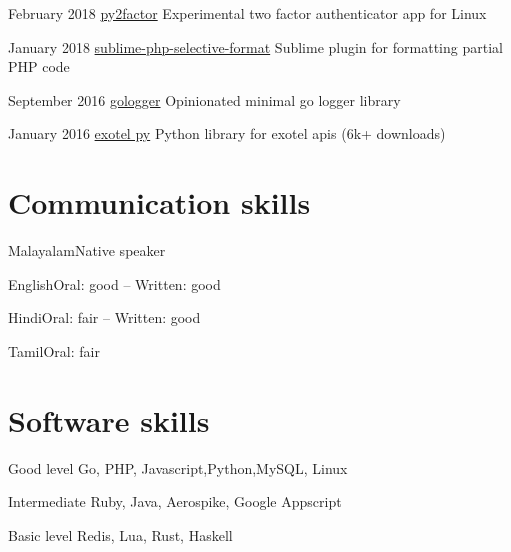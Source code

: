 \documentclass{tccv}
\begin{document}
 \begin{yearlist}

 \item{February 2018}
      {\href{http://me.sarathsp.com/py2factor/}{py2factor}}
      {Experimental two factor authenticator app for Linux}

 \item{January 2018}
      {\href{https://github.com/sarathsp06/sublime-php-selective-format}{sublime-php-selective-format}}
      {Sublime plugin for formatting partial PHP code }

 \item{September 2016}
      {\href{https://github.com/sarathsp06/gologger}{gologger}}
      {Opinionated minimal go logger library}

\item{January 2016}
      {\href{https://github.com/sarathsp06/exotel-py#exotel-py-}{exotel py}}
      {Python library for exotel apis (6k+ downloads)}


\end{yearlist}

\section{Communication skills}

\begin{factlist}
\item{Malayalam}{Native speaker}
\item{English}{Oral: good -- Written: good}
\item{Hindi}{Oral: fair -- Written: good}
\item{Tamil}{Oral: fair}
\end{factlist}

\section{Software skills}

\begin{factlist}

\item{Good level}
     {Go, PHP, Javascript,Python,MySQL, Linux}

\item{Intermediate}
     {Ruby,  Java, Aerospike, Google Appscript}

\item{Basic level}
     {Redis, Lua, Rust, Haskell}

\end{factlist}
\end{document}

